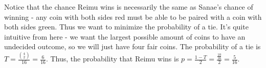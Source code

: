 \begin{sol}Notice that the chance Reimu wins is necessarily the same as Sanae's chance of winning - any coin with both sides red must be able to be paired with a coin with both sides green. Thus we want to minimize the probability of a tie. It's quite intuitive from here - we want the largest possible amount of coins to have an undecided outcome, so we will just have four fair coins. The probability of a tie is $T=\frac{\binom{4}{2}}{16}=\frac{6}{16}.$ Thus, the probability that Reimu wins is $p=\frac{1-T}{2}=\frac{\frac{10}{16}}{2}=\frac{5}{16}.$\end{sol}